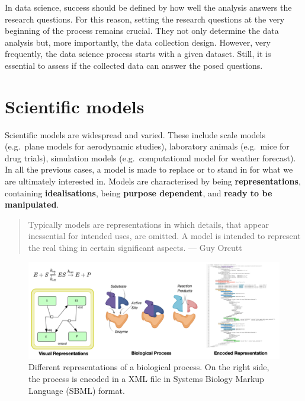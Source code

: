 \documentclass[
]{book}
\begin{document}
In data science, success should be defined by how well the analysis answers the research questions. For this reason, setting the research questions at the very beginning of the process remains crucial. They not only determine the data analysis but, more importantly, the data collection design. However, very frequently, the data science process starts with a given dataset. Still, it is essential to assess if the collected data can answer the posed questions.

\hypertarget{scientific-models}{%
\section{Scientific models}\label{scientific-models}}

Scientific models are widespread and varied. These include scale models (e.g.~plane models for aerodynamic studies), laboratory animals (e.g.~mice for drug trials), simulation models (e.g.~computational model for weather forecast). In all the previous cases, a model is made to replace or to stand in for what we are ultimately interested in. Models are characterised by being \textbf{representations}, containing \textbf{idealisations}, being \textbf{purpose dependent}, and \textbf{ready to be manipulated}.

\begin{quote}
Typically models are representations in which details, that appear inessential for intended uses, are omitted. A model is intended to represent the real thing in certain significant aspects. --- Guy Orcutt
\end{quote}

\begin{figure}

{\centering \includegraphics[width=1\linewidth]{Figures/sbml_model} 

}

\caption{Different representations of a biological process. On the right side, the process is encoded in a XML file in Systems Biology Markup Language (SBML) format. }\label{fig:sbml-model}
\end{figure}
\end{document}
